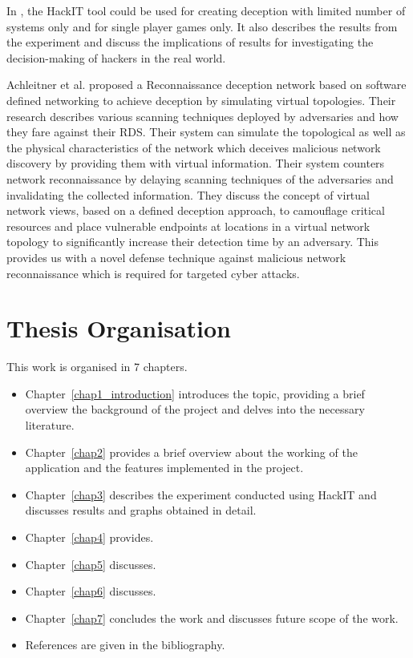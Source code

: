 In \cite{Cyb02}, the HackIT tool could be used for creating deception with limited number of systems only and for single player games only. It also describes the results from the experiment and discuss the implications of results for investigating the decision-making of hackers in the real world.

Achleitner et al. \cite{7971943} proposed a Reconnaissance deception network based on software defined networking to achieve deception by simulating virtual topologies. Their research\cite{7971943} describes various scanning techniques deployed by adversaries and how they fare against their RDS. Their system can simulate the topological as well as the physical characteristics of the network which deceives malicious network discovery by providing them with virtual information. Their system counters network reconnaissance by delaying scanning techniques of the adversaries and invalidating the collected information. They discuss the concept of virtual network views, based on a defined deception approach, to camouflage critical resources and place vulnerable endpoints at locations in a virtual network topology to significantly increase their detection time by an adversary. This provides us with a novel defense technique against malicious network reconnaissance which is required for targeted cyber attacks.
\section{Thesis Organisation}
This work is organised in 7 chapters.
\begin{itemize}
	\item Chapter~\ref{chap1_introduction} introduces the topic, providing a brief overview the background of the project and delves into the necessary literature. 
	\item Chapter~\ref{chap2} provides a brief overview about the working of the application and the features implemented in the project.
	\item Chapter~\ref{chap3} describes the experiment conducted using HackIT and discusses results and graphs obtained in detail. 
	\item Chapter~\ref{chap4} provides.
	\item Chapter~\ref{chap5} discusses.
	\item Chapter~\ref{chap6} discusses.
	\item Chapter~\ref{chap7} concludes the work and discusses future scope of the work.
	\item References are given in the bibliography.
\end{itemize}
